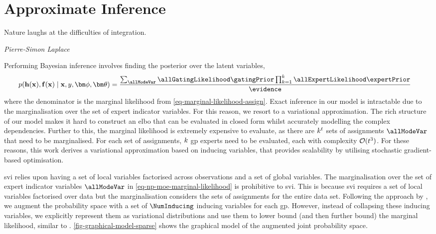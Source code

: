 \documentclass{mimosis-class/mimosis}
\numberwithin{equation}{chapter}
\newcommand{\numData}{\ensuremath{t}}
\newcommand{\modeInd}{\ensuremath{k}}
\newcommand{\NumData}{\ensuremath{\MakeUppercase{\numData}}}
\newcommand{\ModeInd}{\ensuremath{\MakeUppercase{\modeInd}}}
\newcommand{\allData}[1]{\ensuremath{\MakeUppercase{#1}}}
\newcommand{\x}{\ensuremath{\mathbf{x}}}
\newcommand{\y}{\ensuremath{y}}
\newcommand{\allInput}{\ensuremath{\allData{\x}}}
\newcommand{\allOutput}{\ensuremath{\allData{\y}}}
\newcommand{\gatingFunc}{\ensuremath{h}}
\newcommand{\GatingFunc}{\ensuremath{\mathbf{\gatingFunc}}}
\newcommand{\latentFunc}{\ensuremath{f}}
\newcommand{\LatentFunc}{\ensuremath{\mathbf{\latentFunc}}}
\newcommand{\gatingParams}{\ensuremath{\bm\phi}}
\newcommand{\expertParams}{\ensuremath{\bm\theta}}
\begin{document}
{\section{Approximate Inference \label{sec-inference}}
\label{sec:orgc2b9c8c}
\epigraph{Nature laughs at the difficulties of integration.}{\textit{Pierre-Simon Laplace}}
Performing Bayesian inference involves finding the posterior over the latent variables,
\begin{align} \label{eq-}
p(\GatingFunc(\allInput), \LatentFunc(\allInput) \mid \allInput, \allOutput, \gatingParams, \expertParams)
&= \frac{\sum_{\allModeVar} \allGatingLikelihood \gatingPrior
\prod_{\modeInd=1}^{\ModeInd} \allExpertLikelihood \expertPrior}{\evidence}
\end{align}
where the denominator is the marginal likelihood from \cref{eq-marginal-likelihood-assign}.
Exact inference in our model is intractable due to the marginalisation over the set of expert indicator variables.
For this reason, we resort to a variational approximation.
The rich structure of our model makes it hard to construct an \acrshort{elbo} that can
be evaluated in closed form whilst accurately modelling the complex dependencies.
Further to this, the marginal likelihood is extremely expensive to evaluate,
as there are \(\ModeInd^{\NumData}\) sets of assignments \(\allModeVar\) that need to be marginalised.
For each set of assignments, \(\ModeInd\) \acrshort{gp} experts need to be evaluated, each with
complexity \(\mathcal{O}(\NumData^{3})\).
For these reasons, this work derives a variational approximation based on inducing variables, that provides scalability
by utilising stochastic gradient-based optimisation.

\acrfull{svi} \citep{hoffmanStochastic2013} relies upon having a set of local variables
factorised across observations and a set of global variables.
The marginalisation over the set of expert indicator variables \(\allModeVar\)
in \cref{eq-np-moe-marginal-likelihood} is prohibitive to \acrshort{svi}.
This is because \acrshort{svi} requires a set of local variables factorised over data but the
marginalisation considers the sets of assignments for the entire data set.
Following the approach by \cite{titsiasVariational2009}, we augment the probability space
with a set of \(\NumInducing\) inducing variables for each \acrshort{gp}.
However, instead of collapsing these inducing variables, we explicitly
represent them as variational distributions and use them to lower bound
(and then further bound) the marginal likelihood, similar to
\cite{hensmanGaussian2013,hensmanScalable2015}.
\cref{fig-graphical-model-sparse} shows the graphical model of the augmented joint probability space.


}
\end{document}

